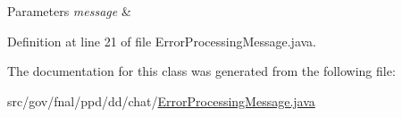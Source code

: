 \begin{DoxyParams}{Parameters}
{\em message} & \\
\hline
\end{DoxyParams}


Definition at line 21 of file Error\-Processing\-Message.\-java.



The documentation for this class was generated from the following file\-:\begin{DoxyCompactItemize}
\item 
src/gov/fnal/ppd/dd/chat/\hyperlink{ErrorProcessingMessage_8java}{Error\-Processing\-Message.\-java}\end{DoxyCompactItemize}

